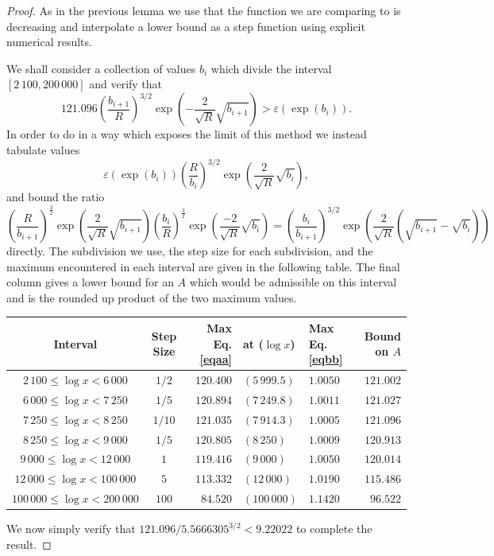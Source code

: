 \documentclass[10pt]{amsart}
\theoremstyle{definition}
\numberwithin{equation}{section}
\begin{document}
\begin{proof}
As in the previous lemma we use that the function we are comparing to is decreasing and interpolate a lower bound as a step function using explicit numerical  results.

We shall consider a collection of values $b_i$ which divide the interval $[2\,100,200\,000]$ and verify that
\[   
121.096 \left(\frac{b_{i+1}}{R}\right)^{3/2}\exp\left(- \frac{2}{\sqrt{R}} \sqrt{b_{i+1}}\right) > \varepsilon(\exp(b_i)) .
\]
In order to do in a way which exposes the limit of this method we instead tabulate values
\begin{equation}\label{eqaa}  
\varepsilon( \exp(b_i) )  \left(\frac{R}{b_{i}}\right)^{3/2}\exp\left( \frac{2}{\sqrt{R}} \sqrt{b_{i}}\right)    ,
\end{equation}
and bound the ratio 
\begin{equation}\label{eqbb} \left(\frac{R}{b_{i+1}}\right)^{\frac{3}{2}}\exp\left( \frac{2}{\sqrt{R}}  \sqrt{b_{i+1}}\right) \left(\frac{b_{i}}{R}\right)^{\frac{3}{2}}\exp\left( \frac{-2}{\sqrt{R}}  \sqrt{b_{i}}\right)  = \left(\frac{b_i}{b_{i+1}}\right)^{3/2}\exp\left(\frac{2}{\sqrt{R}}(\sqrt{b_{i+1}}-\sqrt{b_{i}})\right)
\end{equation}
directly. The subdivision we use, the step size for each subdivision, and the maximum encountered in each interval are given in the following table.
The final column gives a lower bound for an $A$ which would be admissible on this interval and is the rounded up product of the two maximum values.


\begin{center}
\begin{tabular}{|c|c|rl|l|r|}
\hline
Interval & Step Size & Max Eq. \eqref{eqaa} & at ($ \log x $) & Max Eq. \eqref{eqbb} &  Bound on $A$\\
\hline
$2\,100 \leq  \log x  < 6\,000$ & $1/2$ &  $120.400$ &$(5\,999.5)$ & $1.0050$ &  $121.002$  \\ 
$6\,000 \leq  \log x  < 7\,250$ & $1/5$ & $120.894$  &$(7\,249.8)$ & $1.0011$ & $121.027$  \\ 
$7\,250 \leq  \log x  < 8\,250$ & $1/10$ & $121.035$ &$(7\,914.3)$ & $1.0005$ & $121.096$ \\ 
$8\,250 \leq  \log x  < 9\,000$  & $1/5$ & $120.805$ &$(8\,250)$  & $1.0009$ &  $120.913$ \\  
$9\,000 \leq  \log x  < 12\,000$  & $1$ &  $119.416$ &$(9\,000)$  & $1.0050$ &  $120.014$ \\  
$12\,000 \leq  \log x  < 100\,000$  & $5$ & $113.332$ &$(12\,000)$   & $1.0190$ &  $115.486$ \\ 
$100\,000 \leq  \log x  < 200\,000$  & $100$ & $84.520$ &$(100\,000)$  & $1.1420$ &  $96.522$ \\ 
\hline
\end{tabular}
\end{center}
We now simply verify that $121.096/5.5666305^{3/2} < 9.22022$ to complete the result. 
\end{proof}
\end{document}
